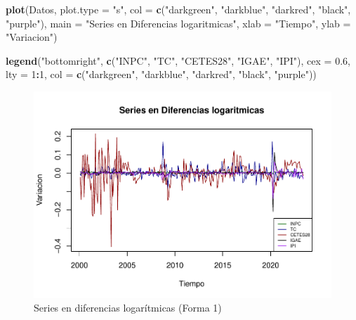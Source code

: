 \documentclass[
]{book}
\newenvironment{Shaded}{\begin{snugshade}}{\end{snugshade}}
\newcommand{\AttributeTok}[1]{\textcolor[rgb]{0.13,0.29,0.53}{#1}}
\newcommand{\DecValTok}[1]{\textcolor[rgb]{0.00,0.00,0.81}{#1}}
\newcommand{\FloatTok}[1]{\textcolor[rgb]{0.00,0.00,0.81}{#1}}
\newcommand{\FunctionTok}[1]{\textcolor[rgb]{0.13,0.29,0.53}{\textbf{#1}}}
\newcommand{\NormalTok}[1]{#1}
\newcommand{\SpecialCharTok}[1]{\textcolor[rgb]{0.81,0.36,0.00}{\textbf{#1}}}
\newcommand{\StringTok}[1]{\textcolor[rgb]{0.31,0.60,0.02}{#1}}
\begin{document}
\begin{Shaded}
\begin{Highlighting}[]
\FunctionTok{plot}\NormalTok{(Datos, }\AttributeTok{plot.type =} \StringTok{"s"}\NormalTok{, }
     \AttributeTok{col =} \FunctionTok{c}\NormalTok{(}\StringTok{"darkgreen"}\NormalTok{, }\StringTok{"darkblue"}\NormalTok{, }\StringTok{"darkred"}\NormalTok{, }\StringTok{"black"}\NormalTok{, }\StringTok{"purple"}\NormalTok{), }
     \AttributeTok{main =} \StringTok{"Series en Diferencias logaritmicas"}\NormalTok{, }
     \AttributeTok{xlab =} \StringTok{"Tiempo"}\NormalTok{, }\AttributeTok{ylab =} \StringTok{"Variacion"}\NormalTok{)}

\FunctionTok{legend}\NormalTok{(}\StringTok{"bottomright"}\NormalTok{, }\FunctionTok{c}\NormalTok{(}\StringTok{"INPC"}\NormalTok{, }\StringTok{"TC"}\NormalTok{, }\StringTok{"CETES28"}\NormalTok{, }\StringTok{"IGAE"}\NormalTok{, }\StringTok{"IPI"}\NormalTok{),}
       \AttributeTok{cex =} \FloatTok{0.6}\NormalTok{, }\AttributeTok{lty =} \DecValTok{1}\SpecialCharTok{:}\DecValTok{1}\NormalTok{, }
       \AttributeTok{col =} \FunctionTok{c}\NormalTok{(}\StringTok{"darkgreen"}\NormalTok{, }\StringTok{"darkblue"}\NormalTok{, }\StringTok{"darkred"}\NormalTok{, }\StringTok{"black"}\NormalTok{, }\StringTok{"purple"}\NormalTok{))}
\end{Highlighting}
\end{Shaded}

\begin{figure}

{\centering \includegraphics{Notas-Series-Tiempo_files/figure-latex/fig62-1} 

}

\caption{Series en diferencias logarítmicas (Forma 1)}\label{fig:fig62}
\end{figure}
\end{document}
